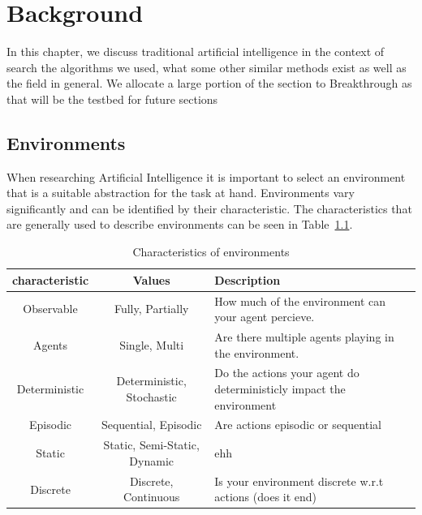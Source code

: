 \chapter{Background\label{cha:background}}

In this chapter, we discuss traditional artificial intelligence in the context of search the algorithms we used, what some other similar methods exist as well as the field in general. We allocate a large portion of the section to Breakthrough as that will be the testbed for future sections

\section{Environments}
\label{sec:environments}

When researching Artificial Intelligence it is important to select an environment that is a suitable abstraction for the task at hand. Environments vary significantly and can be identified by their characteristic. The characteristics that are generally used to describe environments can be seen in Table~\ref{tab:env_characteristics}. \cite{Russell:AIModern}

\begin{table}[h]
  \centering
  \begin{tabular}{|c|c|p{6cm}|}
    \hline
    \textbf{characteristic} & \textbf{Values}              & \textbf{Description}                                                \\
    \hline
    Observable              & Fully, Partially             & How much of the environment can your agent percieve.                \\
    \hline
    Agents                  & Single, Multi                & Are there multiple agents playing in the environment.               \\
    \hline
    Deterministic           & Deterministic, Stochastic    & Do the actions your agent do deterministicly impact the environment \\
    \hline
    Episodic                & Sequential, Episodic         & Are actions episodic or sequential                                  \\
    \hline
    Static                  & Static, Semi-Static, Dynamic & ehh                                                                 \\
    \hline
    Discrete                & Discrete, Continuous         & Is your environment discrete w.r.t actions (does it end)            \\
    \hline
  \end{tabular}
  \caption{Characteristics of environments}
  \label{tab:env_characteristics}
\end{table}

